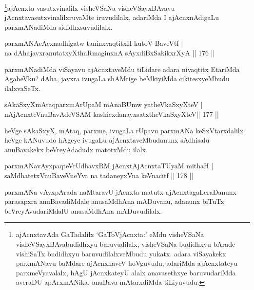 \begin{artha}
\footnote{ajAcnxtavAda GaTadalilx `GaToVjAcnxta:' eMdu visheVSaNa visheVSayxBAvabudidhxyu baruvudilalx, visheVSaNa budidhxyu bArade vishiSaTx budidhxyu baruvudilalxveMbudu yukatx. adara viSayakekx parxmANavu baMdare ajAcnxnaveV hoVguvudu, adariMda ajAcnxtateyu parxmeVyavalalx, hAgU jAcnxkateyU alalx anavasethxye baruvudariMda averaDU apArxmANika. anuBava mAtarxdiMda tiLiyuvudu.}ajAcnxta vasutxvinalilx visheVSaNa visheVSayxBAvavu jAcnxtavasutxvinalilxruvaMte iruvudilalx, adariMda I ajAcnxnAdigaLu parxmANadiMda sididhxsuvudilalx.
\end{artha}


\begin{shl}
parxmANAcAcxnadhigatw taninxvaqtitxH kutoV BaveVtf |  \\
na dAhajavxranutatxyXthaRmaginxnA sAyxdiBxSakikxrXyA \hfill||  176 ||  
\end{shl}

\begin{artha}
parxmANadiMda viSayavu ajAcnxtaveMdu tiLidare adara nivaqtitx EtariMda AgabeVku? dAha, javxra ivugaLa shAMtige beMkiyiMda cikitesxyeMbudu ilalxvaSeTx.
\end{artha}

\begin{shl}
sAkaSxyXmAtaqparxmArUpaM mAnaBUmw yatheVkaSxyXteV | \\
nAjAcnxteV\s nuBavAdeVSAM kashicxdanayxsatxtheVkaSxyXteV\hfill ||  177 ||  
\end{shl}

\begin{artha}
heVge sAkaSxyX, mAtaq, parxme, ivugaLa rUpavu parxmANa keSxVtarxdalilx heVge kANuvudo hAgeye ivugaLu ajAcnxtaveMbudanunx sAdhisalu anuBavakekx beVreyAdadudx matotxMdu ilalx.
\end{artha}

\begin{shl}
parxmANavAyxpaqteVrUdhavxRM jAcnxtAjAcnxtaTUyaM mithaH | \\
saMdhatetxV\s nuBaveVneYva na tadaneyxVna keVnacitf \hfill||  178 ||  
\end{shl}

\begin{artha}
parxmANa vAyxpArada naMtaravU jAcnxta matutx ajAcnxtagaLeraDanunx parasapxra anuBavadiMdale anusaMdhAna mADuvanu, adanunx biTuTx beVreyAvudariMdalU anusaMdhAna mADuvudilalx.
\end{artha}

